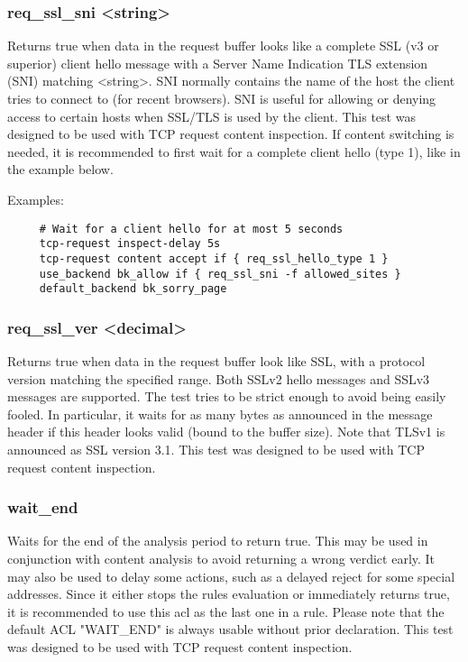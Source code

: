 \subsubsection[req\_ssl\_sni]{req\_ssl\_sni <string>}
  Returns true when data in the request buffer looks like a complete SSL (v3
  or superior) client hello message with a Server Name Indication TLS extension
  (SNI) matching <string>. SNI normally contains the name of the host the
  client tries to connect to (for recent browsers). SNI is useful for allowing
  or denying access to certain hosts when SSL/TLS is used by the client. This
  test was designed to be used with TCP request content inspection. If content
  switching is needed, it is recommended to first wait for a complete client
  hello (type 1), like in the example below.

  Examples:
  \begin{verbatim}
     # Wait for a client hello for at most 5 seconds
     tcp-request inspect-delay 5s
     tcp-request content accept if { req_ssl_hello_type 1 }
     use_backend bk_allow if { req_ssl_sni -f allowed_sites }
     default_backend bk_sorry_page  
  \end{verbatim}

\subsubsection[req\_ssl\_ver]{req\_ssl\_ver <decimal>}
  Returns true when data in the request buffer look like SSL, with a protocol
  version matching the specified range. Both SSLv2 hello messages and SSLv3
  messages are supported. The test tries to be strict enough to avoid being
  easily fooled. In particular, it waits for as many bytes as announced in the
  message header if this header looks valid (bound to the buffer size). Note
  that TLSv1 is announced as SSL version 3.1. This test was designed to be used
  with TCP request content inspection.

\subsubsection{wait\_end}
  Waits for the end of the analysis period to return true. This may be used in
  conjunction with content analysis to avoid returning a wrong verdict early.
  It may also be used to delay some actions, such as a delayed reject for some
  special addresses. Since it either stops the rules evaluation or immediately
  returns true, it is recommended to use this acl as the last one in a rule.
  Please note that the default ACL "WAIT\_END" is always usable without prior
  declaration. This test was designed to be used with TCP request content
  inspection.

